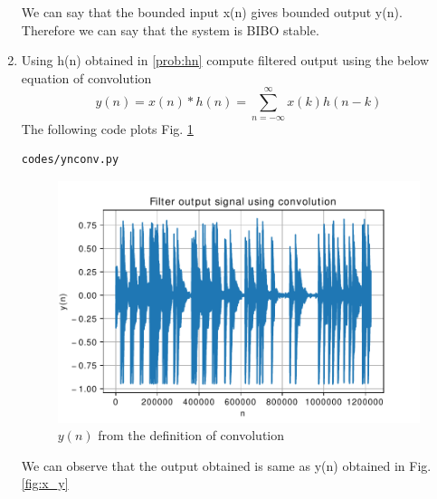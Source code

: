 \documentclass[journal,12pt,twocolumn]{IEEEtran}
\renewcommand\thesection{\arabic{section}}
\begin{document}
\begin{enumerate}[label=\thesection.\arabic*,ref=\thesection.\theenumi]
We can say that the bounded input x(n) gives bounded output
y(n). Therefore we can say that the system is BIBO stable.

\item Using h(n) obtained in \ref{prob:hn} compute filtered output using the below equation of convolution
%
\begin{equation} 
\label{eq:convolution}
y(n) = x(n)*h(n) = \sum_{n=-\infty}^{\infty}x(k)h(n-k)
\end{equation}
\solution The following code plots Fig. \ref{fig:ynconv}
%
\begin{lstlisting}
codes/ynconv.py
\end{lstlisting}
\begin{figure}[!ht]
\centering
\includegraphics[width=\columnwidth]{./figs/ynconv}
\caption{$y(n)$ from the definition of convolution}
\label{fig:ynconv}
\end{figure}

We can observe that the output obtained is same as y(n) obtained in Fig. \ref{fig:x_y}

\end{enumerate}
\end{document}
